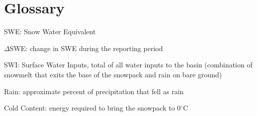 \documentclass[11pt, oneside]{article}
\begin{document}
\clearpage



\clearpage


\clearpage


\clearpage
\begin{centering}

\end{centering}
\clearpage





\clearpage
\section*{Glossary}

\begin{itemize}
	\setlength\itemsep{0.05em}
	\footnotesize{
		\item[] SWE: Snow Water Equivalent
		\item[] $\Delta$SWE: change in SWE during the reporting period
		\item[] SWI: Surface Water Inputs, total of all water inputs to the basin (combination of snowmelt that exits the base of the snowpack and rain on bare ground)
		\item[] Rain: approximate percent of precipitation that fell as rain
		\item[] Cold Content: energy required to bring the snowpack to 0$^{\circ}$C
	}
\end{itemize}
\end{document}
